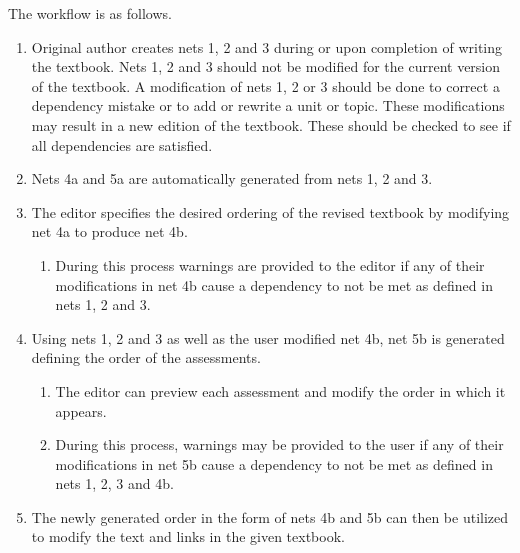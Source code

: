 The workflow is as follows.

\begin{enumerate}
    \item Original author creates nets 1, 2 and 3 during or upon completion of writing the textbook. Nets 1, 2 and 3 should not be modified for the current version of the textbook. A modification of nets 1, 2 or 3 should be done to correct a dependency mistake or to add or rewrite a unit or topic. These modifications may result in a new edition of the textbook. These should be checked to see if all dependencies are satisfied.
    \item Nets 4a and 5a are automatically generated from nets 1, 2 and 3.
    \item The editor specifies the desired ordering of the revised textbook by modifying net 4a to produce net 4b.
        \begin{enumerate}
            \item During this process warnings are provided to the editor if any of their modifications in net 4b cause a dependency to not be met as defined in nets 1, 2 and 3.
        \end{enumerate}
    \item Using nets 1, 2 and 3 as well as the user modified net 4b, net 5b is generated defining the order of the assessments.
        \begin{enumerate}
            \item The editor can preview each assessment and modify the order in which it appears.
            \item During this process, warnings may be provided to the user if any of their modifications in net 5b cause a dependency to not be met as defined in nets 1, 2, 3 and 4b.
        \end{enumerate}
    \item The newly generated order in the form of nets 4b and 5b can then be utilized to modify the text and links in the given textbook.
\end{enumerate}
